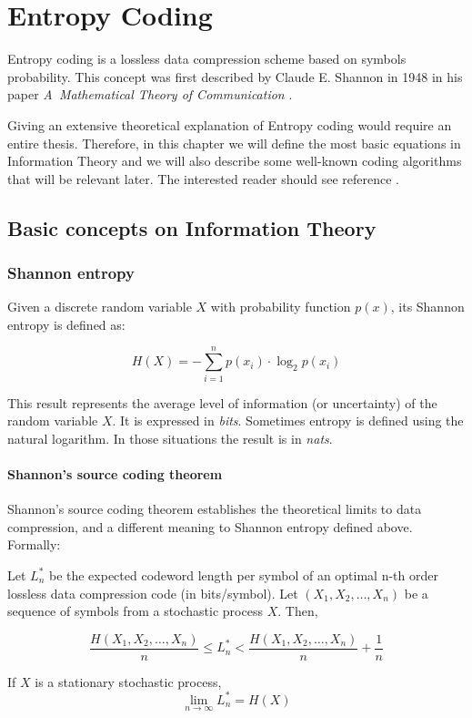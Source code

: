 \chapter{Entropy Coding} \label{ch:entropy_coding}
Entropy coding is a lossless data compression scheme based on symbols probability. This concept was first described by Claude E. Shannon in 1948 in his paper \textit{A~Mathematical Theory of Communication} \parencite{Shannon1948}.

Giving an extensive theoretical explanation of Entropy coding would require an entire thesis. Therefore, in this chapter we will define the most basic equations in Information Theory and we will also describe some well-known coding algorithms that will be relevant later. The interested reader should see reference \parencite{cover}.

\section{Basic concepts on Information Theory}
\subsection{Shannon entropy}
Given a discrete random variable $X$ with probability function $p(x)$, its Shannon entropy is defined as:

\begin{equation}
H(X) = - \sum_{i=1}^{n} p(x_i) \cdot \log_2 p(x_i) 
\end{equation}

This result represents the average level of information (or uncertainty) of the random variable $X$. It is expressed in \textit{bits}. Sometimes entropy is defined using the natural logarithm. In those situations the result is in \textit{nats}.

\subsubsection{Shannon's source coding theorem}
Shannon's source coding theorem establishes the theoretical limits to data compression, and a different meaning to Shannon entropy defined above. Formally:

\begin{theorem}
Let $L_n^*$ be the expected codeword length per symbol of an optimal n-th order lossless data compression code (in bits/symbol). Let $(X_1, X_2, \dots, X_n )$ be a sequence of symbols from a stochastic process $X$. Then,

\begin{equation}
	\frac{H(X_1, X_2, \dots, X_n )}{n} \leq L_n^* < \frac{H(X_1, X_2, \dots, X_n )}{n} + \frac{1}{n}
\end{equation}

If $X$ is a stationary stochastic process,
\begin{equation}
	\lim_{n \to \infty} L_n^* = H(X)
\end{equation}
\end{theorem}

